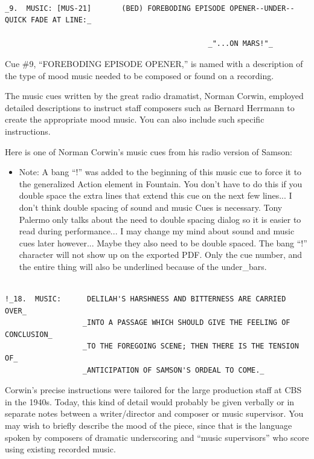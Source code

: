 \documentclass[openleft,oneside,showtrims]{memoir}
\begin{document}
\begin{itemize}
\begin{itemize}
\lstset{language=fountain,label= ,caption= ,captionpos=b,numbers=none}
\begin{lstlisting}

_9.  MUSIC: [MUS-21]       (BED) FOREBODING EPISODE OPENER--UNDER--QUICK FADE AT LINE:_ 

                                               _"...ON MARS!"_

\end{lstlisting}

Cue \#9, ``FOREBODING EPISODE OPENER,'' is named with a description of the type of mood music needed to be composed or found on a recording.

The music cues written by the great radio dramatist, Norman Corwin, employed detailed descriptions to instruct staff composers such as Bernard Herrmann to create the appropriate mood music. You can also include such specific instructions.

Here is one of Norman Corwin's music cues from his radio version of Samson:

\begin{itemize}
\item Note: A bang ``!'' was added to the beginning of this music cue to force it to the generalized Action element in Fountain.  You don't have to do this if you double space the extra lines that extend this cue on the next few lines... I don't think double spacing of sound and music Cues is necessary.  Tony Palermo only talks about the need to double spacing dialog so it is easier to read during performance...  I may change my mind about sound and music cues later however... Maybe they also need to be double spaced. The bang ``!'' character will not show up on the exported PDF.  Only the cue number, and the entire thing will also be underlined because of the under\_bars.
\end{itemize}

\lstset{language=fountain,label= ,caption= ,captionpos=b,numbers=none}
\begin{lstlisting}

!_18.  MUSIC:      DELILAH'S HARSHNESS AND BITTERNESS ARE CARRIED OVER_ 
                  _INTO A PASSAGE WHICH SHOULD GIVE THE FEELING OF CONCLUSION_ 
                  _TO THE FOREGOING SCENE; THEN THERE IS THE TENSION OF_ 
                  _ANTICIPATION OF SAMSON'S ORDEAL TO COME._

\end{lstlisting}

Corwin's precise instructions were tailored for the large production staff at CBS in the 1940s. Today, this kind of detail would probably be given verbally or in separate notes between a writer/director and composer or music supervisor. You may wish to briefly describe the mood of the piece, since that is the language spoken by composers of dramatic underscoring and ``music supervisors'' who score using existing recorded music.


\end{itemize}
\end{itemize}
\end{document}
